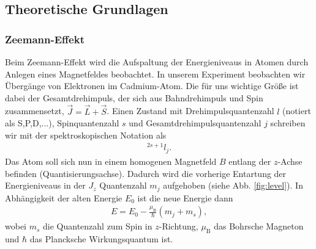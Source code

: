 \subsection{Theoretische Grundlagen}
\subsubsection{Zeemann-Effekt}
Beim Zeemann-Effekt wird die Aufspaltung der Energieniveaus in Atomen durch Anlegen eines Magnetfeldes beobachtet. In unserem Experiment beobachten wir Übergänge von Elektronen im Cadmium-Atom. Die für uns wichtige Größe ist dabei der Gesamtdrehimpuls, der sich aus Bahndrehimpuls und Spin zusammensetzt, $\vec{J}=\vec{L}+\vec{S}$. Einen Zustand mit Drehimpulsquantenzahl $l$ (notiert als S,P,D,...), Spinquantenzahl $s$ und Gesamtdrehimpulsquantenzahl $j$ schreiben wir mit der spektroskopischen Notation als
\begin{align*}
  ^{2s+1}l_j.
\end{align*}
Das Atom soll sich nun in einem homogenen Magnetfeld $B$ entlang der $z$-Achse befinden (Quantisierungsachse). Dadurch wird die vorherige Entartung der Energieniveaus in der $J_z$ Quantenzahl $m_j$ aufgehoben (siehe Abb. \ref{fig:level}). In Abhängigkeit der alten Energie $E_0$ ist die neue Energie dann\cite{shankar}
\begin{align*}
  E=E_0-\frac{\mu_\mathrm{B}}{\hbar}\left( m_j+m_s\right),
\end{align*}
wobei $m_s$ die Quantenzahl zum Spin in $z$-Richtung, $\mu_\mathrm{B}$ das Bohrsche Magneton und $\hbar$ das Plancksche Wirkungsquantum ist.

